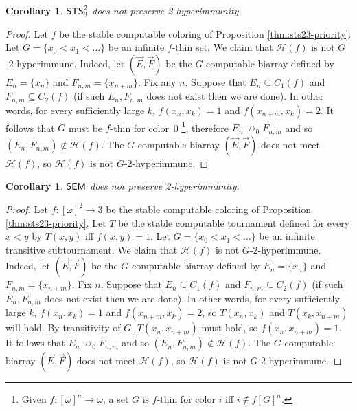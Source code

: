 \documentclass{amsart}
\newtheorem{corollary}[theorem]{Corollary}
\theoremstyle{definition}
\theoremstyle{remark}
\numberwithin{equation}{section}
\theoremstyle{noparens}
\def\propertyL{2-hyperimmunity}
\def\hyper{2-hyperimmune}
\newcommand{\Hcal}{\mathcal{H}}
\newcommand{\s}[1]{\ensuremath{\sf{#1}}}
\DeclareMathOperator{\sts}{\s{STS}}
\DeclareMathOperator{\semo}{\s{SEM}}
\begin{document}
\begin{corollary}
$\sts^2_3$ does not preserve \propertyL.
\end{corollary}
\begin{proof}
Let $f$ be the stable computable coloring of Proposition \ref{thm:sts23-priority}.
Let $G = \{ x_0 < x_1 < \dots \}$ be an infinite $f$-thin set.
We claim that $\Hcal(f)$ is not $G$-\hyper.
 Indeed, let $(\vec{E}, \vec{F})$ be the $G$-computable biarray
defined by $E_n = \{x_n\}$ and $F_{n,m} = \{x_{n+m}\}$. Fix any $n$. Suppose that $E_n \subseteq C_1(f)$
and $F_{n,m} \subseteq C_2(f)$ (if such $E_n,F_{n,m}$ does not exist then we are done).
In other words, for every sufficiently large $k$, $f(x_n, x_k) = 1$
and $f(x_{n+m}, x_k) = 2$. It follows that $G$ must be $f$-thin for color~0
\footnote{Given $f:[\omega]^n\rightarrow\omega$,
a set $G$ is $f$-thin for color $i $ iff $i\notin f[G]^n$.}, therefore $E_n \not \to_0 F_{n,m}$
and so $(E_n, F_{n,m}) \not \in \Hcal(f)$. The $G$-computable biarray $(\vec{E}, \vec{F})$ does not meet $\Hcal(f)$,
so $\Hcal(f)$ is not $G$-\hyper.
\end{proof}

\begin{corollary}
$\semo$ does not preserve \propertyL.
\end{corollary}
\begin{proof}
  Let $f : [\omega]^2\rightarrow 3$ be the stable computable coloring of Proposition \ref{thm:sts23-priority}.
Let $T$ be the stable computable tournament defined for every $x < y$ by $T(x, y)$ iff $f(x, y) = 1$.
Let $G = \{ x_0 < x_1 < \dots \}$ be an infinite transitive subtournament.
We claim that $\Hcal(f)$ is not $G$-\hyper. Indeed, let $(\vec{E}, \vec{F})$ be the $G$-computable biarray
defined by $E_n = \{x_n\}$ and $F_{n,m} = \{x_{n+m}\}$. Fix $n$. Suppose that $E_n \subseteq C_1(f)$
and $F_{n,m} \subseteq C_2(f)$ (if such $E_n,F_{n,m}$ does not exist then we are done). In other words, for every sufficiently large $k$, $f(x_n, x_k) = 1$
and $f(x_{n+m}, x_k) = 2$, so $T(x_n, x_k)$ and $T(x_k, x_{n+m})$ will hold.
By transitivity of $G$, $T(x_n, x_{n+m})$ must hold, so $f(x_n, x_{n+m}) = 1$. It follows that $E_n \not \to_0 F_{n,m}$
and so $(E_n, F_{n,m}) \not \in \Hcal(f)$. The $G$-computable biarray $(\vec{E}, \vec{F})$ does not meet $\Hcal(f)$,
so $\Hcal(f)$ is not $G$-\hyper.
\end{proof}



\end{document}
